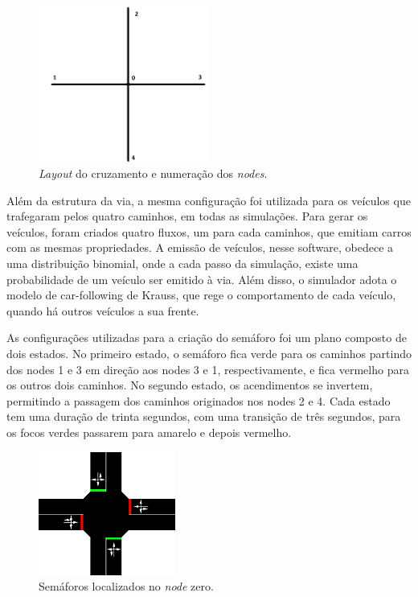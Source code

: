 \begin{figure}[ht]
    \begin{center}
    \includegraphics[width=0.5\textwidth]{figuras/Simulation_Scenario.png}
    \end{center}
    \caption[Estrutura da simulação]{\textit{Layout} do cruzamento e numeração dos \textit{nodes}.}
    \label{simulationLayout}
\end{figure}

Além da estrutura da via, a mesma configuração foi utilizada para os veículos que trafegaram pelos quatro caminhos, em todas as simulações. Para gerar os veículos, foram criados quatro fluxos, um para cada caminhos, que emitiam carros com as mesmas propriedades. A emissão de veículos, nesse software, obedece a uma distribuição binomial, onde a cada passo da simulação, existe uma probabilidade de um veículo ser emitido à via. Além disso, o simulador adota o modelo de car-following de Krauss, que rege o comportamento de cada veículo, quando há outros veículos a sua frente.

As configurações utilizadas para a criação do semáforo foi um plano composto de dois estados. No primeiro estado, o semáforo fica verde para os caminhos partindo dos nodes 1 e 3 em direção aos nodes 3 e 1, respectivamente, e fica vermelho para os outros dois caminhos. No segundo estado, os acendimentos se invertem, permitindo a passagem dos caminhos originados nos nodes 2 e 4. Cada estado tem uma duração de trinta segundos, com uma transição de três segundos, para os focos verdes passarem para amarelo e depois vermelho.

\begin{figure}[ht]
    \begin{center}
    \includegraphics[width=0.4\textwidth]{figuras/Traffic_Light.PNG}
    \end{center}
    \caption[Semáforo simulado]{Semáforos localizados no \textit{node} zero.}
    \label{TrafficLight}
\end{figure}

